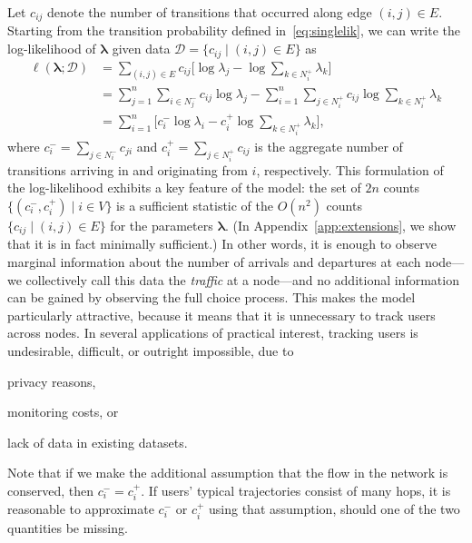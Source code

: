Let $c_{ij}$ denote the number of transitions that occurred along edge $(i, j) \in E$.
Starting from the transition probability defined in~\eqref{eq:singlelik}, we can write the log-likelihood of $\bm{\lambda}$ given data $\mathcal{D} = \{ c_{ij} \mid (i, j) \in E \}$ as
\begin{align}
\ell(\bm{\lambda} ; \mathcal{D})
    &= \sum_{(i,j) \in E} c_{ij} \bigg[ \log \lambda_j - \log \sum_{k \in N^+_i} \lambda_k \bigg] \nonumber \\
    &= \sum_{j = 1}^n \sum_{i \in N^-_j}\!c_{ij} \log \lambda_j
       - \sum_{i = 1}^n \sum_{j \in N^+_i}\!c_{ij} \log \sum_{k \in N^+_i} \lambda_k \nonumber \\
    &= \sum_{i = 1}^n \bigg[ c^-_i \log \lambda_i - c^+_i \log \sum_{k \in N^+_i} \lambda_k \bigg], \label{eq:loglik}
\end{align}
where $c^-_i = \sum_{j \in N^-_i} c_{ji}$ and $c^+_i = \sum_{j \in N^+_i} c_{ij}$ is the aggregate number of transitions arriving in and originating from $i$, respectively.
This formulation of the log-likelihood exhibits a key feature of the model:
the set of $2n$ counts $\{ (c^-_i, c^+_i) \mid i \in V \}$ is a sufficient statistic of the $O(n^2)$ counts $\{ c_{ij} \mid (i, j) \in E \}$ for the parameters $\bm{\lambda}$.
(In Appendix~\ref{app:extensions}, we show that it is in fact minimally sufficient.)
In other words, it is enough to observe marginal information about the number of arrivals and departures at each node---we collectively call this data the \emph{traffic} at a node---and no additional information can be gained by observing the full choice process.
This makes the model particularly attractive, because it means that it is unnecessary to track users across nodes.
In several applications of practical interest, tracking users is undesirable, difficult, or outright impossible, due to
\begin{enuminline}
\item privacy reasons,
\item monitoring costs, or
\item lack of data in existing datasets.
\end{enuminline}

Note that if we make the additional assumption that the flow in the network is conserved, then $c^-_i = c^+_i$.
If users' typical trajectories consist of many hops, it is reasonable to approximate $c^-_i$ or $c^+_i$ using that assumption, should one of the two quantities be missing.

